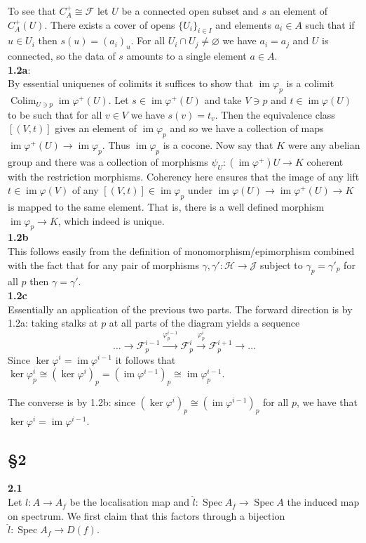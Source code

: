 \documentclass[12pt]{article}
\numberwithin{thm}{subsection}
\numberwithin{defn}{subsection}
\numberwithin{lemma}{subsection}
\numberwithin{example}{subsection}
\numberwithin{notation}{subsection}
\numberwithin{cor}{subsection}
\numberwithin{remark}{subsection}
\numberwithin{condition}{subsection}
\numberwithin{question}{subsection}
\numberwithin{construction}{subsection}
\numberwithin{construction}{subsection}
\numberwithin{construction}{subsection}
\newcommand{\scr}[1]{\mathscr{#1}}
\newcommand{\lto}{\longrightarrow}
\newcommand{\im}{\operatorname{im}}
\begin{document}
To see that $C_A^+ \cong \scr{F}$ let $U$ be a connected open subset and $s$ an element of $C_A^+(U)$. There exists a cover of opens $\lbrace U_i\rbrace_{i \in I}$ and elements $a_i \in A$ such that if $u \in U_i$ then $s(u) = (a_i)_u$. For all $U_i \cap U_j \neq \varnothing$ we have $a_i = a_j$ and $U$ is connected, so the data of $s$ amounts to a single element $a \in A$.\\
\textbf{1.2a}:\\
By essential uniquenes of colimits it suffices to show that $\im\varphi_p$ is a colimit $\operatorname{Colim}_{U \ni p}\im\varphi^+(U)$. Let $s \in \im\varphi^+(U)$ and take $V \ni p$ and $t \in \im\varphi(U)$ to be such that for all $v \in V$ we have $s(v) = t_v$. Then the equivalence class $[(V,t)]$ gives an element of $\im\varphi_p$ and so we have a collection of maps $\im\varphi^+(U) \to \im\varphi_p$. Thus $\im\varphi_p$ is a cocone. Now say that $K$ were any abelian group and there was a collection of morphisms $\psi_U: (\im\varphi^+)U \to K$ coherent with the restriction morphisms. Coherency here ensures that the image of any lift $t \in \im\varphi(V)$ of any $[(V,t)] \in \im\varphi_p$ under $\im\varphi(U) \lto \im\varphi^+(U) \lto K$ is mapped to the same element. That is, there is a well defined morphism $\im\varphi_p \to K$, which indeed is unique.\\
\textbf{1.2b}\\
This follows easily from the definition of monomorphism/epimorphism combined with the fact that for any pair of morphisms $\gamma,\gamma': \scr{H} \to \scr{J}$ subject to $\gamma_p = \gamma'_p$ for all $p$ then $\gamma = \gamma'$.\\
\textbf{1.2c}\\
Essentially an application of the previous two parts. The forward direction is by 1.2a: taking stalks at $p$ at all parts of the diagram yields a sequence
\[\hdots\lto \scr{F}^{i-1}_p \stackrel{\varphi^{i-1}_p}{\lto} \scr{F}^i_p \stackrel{\varphi^i_p}{\lto}\scr{F}^{i+1}_p \lto \hdots\]
Since $\ker\varphi^i = \im\varphi^{i-1}$ it follows that $\ker\varphi^i_p \cong (\ker\varphi^i)_p = (\im\varphi^{i-1})_p \cong \im\varphi^{i-1}_p$.

The converse is by 1.2b: since $(\ker\varphi^i)_p \cong (\im\varphi^{i-1})_p$ for all $p$, we have that $\ker\varphi^i = \im\varphi^{i-1}$.

\subsection{\S 2}
\textbf{2.1}\\
Let $l: A \lto A_f$ be the localisation map and $\hat{l}: \operatorname{Spec}A_f \lto \operatorname{Spec}A$ the induced map on spectrum. We first claim that this factors through a bijection $\hat{l}: \operatorname{Spec}A_f \lto D(f)$.
\end{document}
